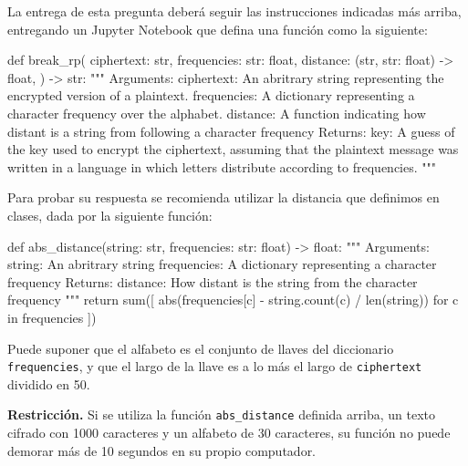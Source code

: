 La entrega de esta pregunta deberá seguir las instrucciones indicadas más arriba, entregando un Jupyter Notebook que defina una función como la siguiente:

\bigskip
\begin{python}
  def break_rp(
      ciphertext: str,
      frequencies: {str: float},
      distance: (str, {str: float}) -> float,
    ) -> str:
    """
    Arguments:
      ciphertext: An abritrary string representing the
                  encrypted version of a plaintext.
      frequencies: A dictionary representing a character
                   frequency over the alphabet.
      distance: A function indicating how distant is a string
                from following a character frequency
    Returns:
      key: A guess of the key used to encrypt the ciphertext, assuming
           that the plaintext message was written in a language in which
           letters distribute according to frequencies.
    """
\end{python}

Para probar su respuesta se recomienda utilizar la distancia que definimos en clases, dada por la siguiente función:

\bigskip
\begin{python}
  def abs_distance(string: str, frequencies: {str: float}) -> float:
    """
    Arguments:
      string: An abritrary string
      frequencies: A dictionary representing a character frequency
    Returns:
      distance: How distant is the string from the character frequency
    """
    return sum([
      abs(frequencies[c] - string.count(c) / len(string))
      for c in frequencies
    ])
\end{python}
Puede suponer que el alfabeto es el conjunto de llaves del diccionario \texttt{frequencies}, y que el largo de la llave es a lo más el largo de \texttt{ciphertext} dividido en 50.

\textbf{Restricción.} Si se utiliza la función \texttt{abs\_distance} definida arriba, un texto cifrado con 1000 caracteres y un alfabeto de 30 caracteres, su función no puede demorar más de 10 segundos en su propio computador.

